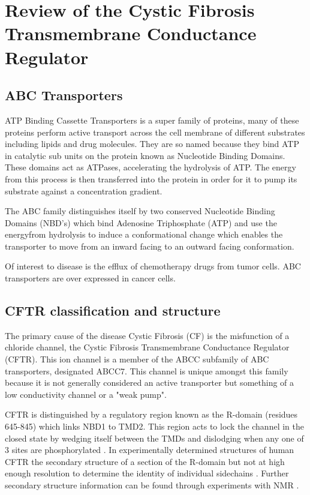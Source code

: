 \chapter{Review of the Cystic Fibrosis Transmembrane Conductance Regulator}
\label{chap:cftr_review}
\newpage
\section{ABC Transporters}
ATP Binding Cassette Transporters is a super family of proteins, many of these proteins perform active transport across the cell membrane of different substrates including lipids and drug molecules. They are so named because they bind ATP in catalytic sub units on the protein known as Nucleotide Binding Domains. These domains act as ATPases, accelerating the hydrolysis of ATP. The energy from this process is then transferred into the protein in order for it to pump its substrate against a concentration gradient. 

The ABC family distinguishes itself by two conserved Nucleotide Binding Domains (NBD's) which bind Adenosine Triphosphate (ATP) and use the energyfrom hydrolysis to induce a conformational change which enables the transporter to move from an inward facing to an outward facing conformation.

Of interest to disease is the efflux of chemotherapy drugs from tumor cells. ABC transporters are over expressed in cancer cells. 

\section{CFTR classification and structure}

The primary cause of the disease Cystic Fibrosis (CF) is the misfunction of a chloride channel, the Cystic Fibrosis Transmembrane Conductance Regulator (CFTR). This ion channel is a member of the ABCC subfamily of ABC transporters, designated ABCC7. This channel is unique amongst this family because it is not generally considered an active transporter but something of a low conductivity channel or a "weak pump"\cite{Linsdel2018}.

CFTR is distinguished by a regulatory region known as the R-domain (residues 645-845) which links NBD1 to TMD2. This region acts to lock the channel in the closed state by wedging itself between the TMDs and dislodging when any one of 3 sites are phosphorylated \cite{Mihalyi2020}. In experimentally determined structures of human CFTR the secondary structure of a section of the R-domain but not at high enough resolution to determine the identity of individual sidechains \cite{Zhang2018}\cite{Zhang2016}. Further secondary structure information can be found through experiments with NMR \cite{Baker2007}.

